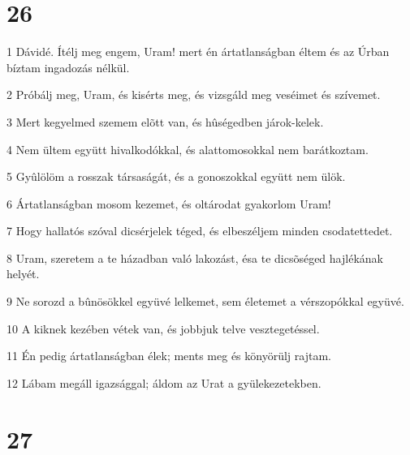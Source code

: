 \chapter{26}

\par 1 Dávidé. Ítélj meg engem, Uram! mert én ártatlanságban éltem és az Úrban bíztam ingadozás nélkül.
\par 2 Próbálj meg, Uram, és kisérts meg, és vizsgáld meg veséimet és szívemet.
\par 3 Mert kegyelmed szemem elõtt van, és hûségedben járok-kelek.
\par 4 Nem ültem együtt hivalkodókkal, és alattomosokkal nem barátkoztam.
\par 5 Gyûlölöm a rosszak társaságát, és a gonoszokkal együtt nem ülök.
\par 6 Ártatlanságban mosom kezemet, és oltárodat gyakorlom Uram!
\par 7 Hogy hallatós szóval dicsérjelek téged, és elbeszéljem minden csodatettedet.
\par 8 Uram, szeretem a te házadban való lakozást, ésa te dicsõséged hajlékának helyét.
\par 9 Ne sorozd a bûnösökkel együvé lelkemet, sem életemet a vérszopókkal együvé.
\par 10 A kiknek kezében vétek van, és jobbjuk telve vesztegetéssel.
\par 11 Én pedig ártatlanságban élek; ments meg és könyörülj rajtam.
\par 12 Lábam megáll igazsággal; áldom az Urat a gyülekezetekben.

\chapter{27}

